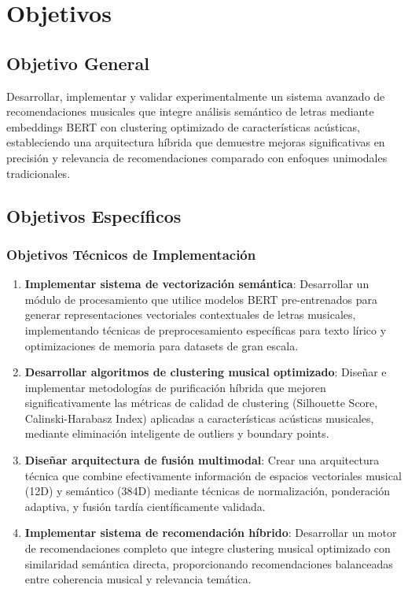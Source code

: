 \documentclass[12pt,a4paper]{article}
\begin{document}
\section{Objetivos}

\subsection{Objetivo General}

Desarrollar, implementar y validar experimentalmente un sistema avanzado de recomendaciones musicales que integre análisis semántico de letras mediante embeddings BERT con clustering optimizado de características acústicas, estableciendo una arquitectura híbrida que demuestre mejoras significativas en precisión y relevancia de recomendaciones comparado con enfoques unimodales tradicionales.

\subsection{Objetivos Específicos}

\subsubsection{Objetivos Técnicos de Implementación}

\begin{enumerate}
    \item \textbf{Implementar sistema de vectorización semántica}: Desarrollar un módulo de procesamiento que utilice modelos BERT pre-entrenados para generar representaciones vectoriales contextuales de letras musicales, implementando técnicas de preprocesamiento específicas para texto lírico y optimizaciones de memoria para datasets de gran escala.
    
    \item \textbf{Desarrollar algoritmos de clustering musical optimizado}: Diseñar e implementar metodologías de purificación híbrida que mejoren significativamente las métricas de calidad de clustering (Silhouette Score, Calinski-Harabasz Index) aplicadas a características acústicas musicales, mediante eliminación inteligente de outliers y boundary points.
    
    \item \textbf{Diseñar arquitectura de fusión multimodal}: Crear una arquitectura técnica que combine efectivamente información de espacios vectoriales musical (12D) y semántico (384D) mediante técnicas de normalización, ponderación adaptiva, y fusión tardía científicamente validada.
    
    \item \textbf{Implementar sistema de recomendación híbrido}: Desarrollar un motor de recomendaciones completo que integre clustering musical optimizado con similaridad semántica directa, proporcionando recomendaciones balanceadas entre coherencia musical y relevancia temática.
\end{enumerate}
\end{document}
